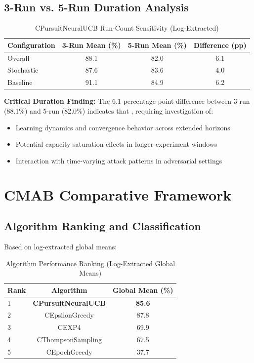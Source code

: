 \documentclass[12pt,a4paper]{article}
\newcommand{\primarytext}[1]{\textcolor{primaryblue}{\textbf{#1}}}
\begin{document}
\subsection{3-Run vs. 5-Run Duration Analysis}

\begin{table}[H]
\centering
\caption{CPursuitNeuralUCB Run-Count Sensitivity (Log-Extracted)}
\begin{tabular}{@{}lccc@{}}
\toprule
\textbf{Configuration} & \textbf{3-Run Mean (\%)} & \textbf{5-Run Mean (\%)} & \textbf{Difference (pp)} \\
\midrule
Overall & 88.1 & 82.0 & 6.1 \\
Stochastic & 87.6 & 83.6 & 4.0 \\
Baseline & 91.1 & 84.9 & 6.2 \\
\bottomrule
\end{tabular}
\end{table}

\textbf{Critical Duration Finding:} The 6.1 percentage point difference between 3-run (88.1\%) and 5-run (82.0\%) indicates that , requiring investigation of:

\begin{itemize}
    \item Learning dynamics and convergence behavior across extended horizons
    \item Potential capacity saturation effects in longer experiment windows
    \item Interaction with time-varying attack patterns in adversarial settings
\end{itemize}

\section{CMAB Comparative Framework}

\subsection{Algorithm Ranking and Classification}

Based on log-extracted global means:

\begin{table}[H]
\centering
\caption{Algorithm Performance Ranking (Log-Extracted Global Means)}
\begin{tabular}{@{}lcc@{}}
\toprule
\textbf{Rank} & \textbf{Algorithm} & \textbf{Global Mean (\%)} \\
\midrule
1 & \primarytext{CPursuitNeuralUCB} & \primarytext{85.6} \\
2 & CEpsilonGreedy & 87.8 \\
3 & CEXP4 & 69.9 \\
4 & CThompsonSampling & 67.5 \\
5 & CEpochGreedy & 37.7 \\
\bottomrule
\end{tabular}
\end{table}
\end{document}
